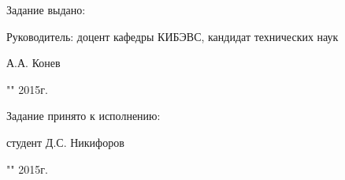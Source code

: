 \newpage
Задание выдано:

Руководитель: доцент кафедры КИБЭВС, кандидат технических наук \\
\begin{singlespace}
А.А. Конев \hfill \underline{\hspace{6cm}} \\
\begin{flushright} "\underline{\hspace{1cm}}"\underline{\hspace{3cm}} 2015г. \end{flushright}
\end{singlespace}

Задание принято к исполнению:

\begin{singlespace}
студент Д.С. Никифоров \hfill \underline{\hspace{6cm}} \\
\begin{flushright} "\underline{\hspace{1cm}}"\underline{\hspace{3cm}} 2015г. \end{flushright}
\end{singlespace}